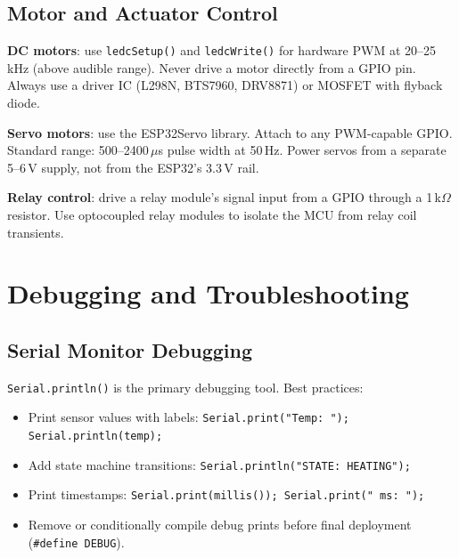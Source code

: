 \documentclass[11pt,letterpaper,twoside,openany]{book}
\begin{document}
\subsection{Motor and Actuator Control}
\textbf{DC motors}: use \texttt{ledcSetup()} and \texttt{ledcWrite()} for hardware PWM at 20--25\,kHz (above audible range). Never drive a motor directly from a GPIO pin. Always use a driver IC (L298N, BTS7960, DRV8871) or MOSFET with flyback diode.

\textbf{Servo motors}: use the ESP32Servo library. Attach to any PWM-capable GPIO. Standard range: 500--2400\,$\mu$s pulse width at 50\,Hz. Power servos from a separate 5--6\,V supply, not from the ESP32's 3.3\,V rail.

\textbf{Relay control}: drive a relay module's signal input from a GPIO through a 1\,k$\Omega$ resistor. Use optocoupled relay modules to isolate the MCU from relay coil transients.

\section{Debugging and Troubleshooting}

\subsection{Serial Monitor Debugging}
\texttt{Serial.println()} is the primary debugging tool. Best practices:
\begin{itemize}[nosep,leftmargin=1.5em]
\item Print sensor values with labels: \texttt{Serial.print("Temp: "); Serial.println(temp);}
\item Add state machine transitions: \texttt{Serial.println("STATE: HEATING");}
\item Print timestamps: \texttt{Serial.print(millis()); Serial.print(" ms: ");}
\item Remove or conditionally compile debug prints before final deployment (\texttt{\#define DEBUG}).
\end{itemize}
\end{document}

